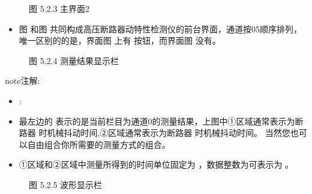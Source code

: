 \documentclass[a4paper,10pt,english]{sphinxmanual}
\begin{document}
\begin{figure}[htbp]
\centering
\capstart

\noindent{}
\caption{图 5.2.3 主界面2}\label{\detokenize{operation_guide:id11}}\end{figure}
\begin{itemize}
\item {} 
\sphinxAtStartPar
图  和图  共同构成高压断路器动特性检测仪的前台界面，通道按0\sphinxhyphen{}5顺序排列，唯一区别的的是，界面图  上有  按钮，而界面图  没有。

\end{itemize}

\begin{figure}[htbp]
\centering
\capstart

\noindent{}
\caption{图 5.2.4 测量结果显示栏}\label{\detokenize{operation_guide:id12}}\end{figure}

\begin{sphinxadmonition}{note}{注解:}\begin{itemize}
\item {} 
\sphinxAtStartPar
{} :

\item {} 
\sphinxAtStartPar
最左边的  表示的是当前栏目为通道0的测量结果，上图中①区域通常表示为断路器  时机械抖动时间,②区域通常表示为断路器  时机械抖动时间。
当然您也可以自由组合你所需要的测量方式的组合。

\item {} 
\sphinxAtStartPar
①区域和②区域中测量所得到的时间单位固定为 ，数据整数为可表示为 。

\end{itemize}
\end{sphinxadmonition}

\begin{figure}[htbp]
\centering
\capstart

\noindent{}
\caption{图 5.2.5 波形显示栏}\label{\detokenize{operation_guide:id13}}\end{figure}
\end{document}
